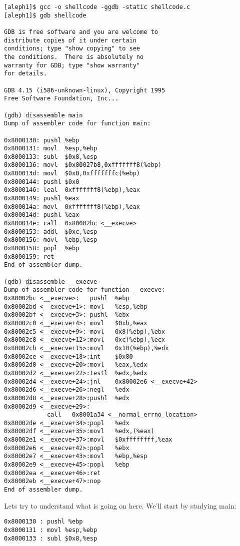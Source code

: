 \documentclass[10pt]{article}
\begin{document}
\begin{CJK}{UTF8}{bsmi}
{\small
\begin{verbatim}
[aleph1]$ gcc -o shellcode -ggdb -static shellcode.c
[aleph1]$ gdb shellcode

GDB is free software and you are welcome to 
distribute copies of it under certain 
conditions; type "show copying" to see 
the conditions.  There is absolutely no 
warranty for GDB; type "show warranty" 
for details.

GDB 4.15 (i586-unknown-linux), Copyright 1995 
Free Software Foundation, Inc...

(gdb) disassemble main
Dump of assembler code for function main:

0x8000130: pushl %ebp
0x8000131: movl  %esp,%ebp
0x8000133: subl  $0x8,%esp
0x8000136: movl  $0x80027b8,0xfffffff8(%ebp)
0x800013d: movl  $0x0,0xfffffffc(%ebp)
0x8000144: pushl $0x0
0x8000146: leal  0xfffffff8(%ebp),%eax
0x8000149: pushl %eax
0x800014a: movl  0xfffffff8(%ebp),%eax
0x800014d: pushl %eax
0x800014e: call  0x80002bc <__execve>
0x8000153: addl  $0xc,%esp
0x8000156: movl  %ebp,%esp
0x8000158: popl  %ebp
0x8000159: ret
End of assembler dump.

(gdb) disassemble __execve
Dump of assembler code for function __execve:
0x80002bc <__execve>:   pushl  %ebp
0x80002bd <__execve+1>: movl   %esp,%ebp
0x80002bf <__execve+3>: pushl  %ebx
0x80002c0 <__execve+4>: movl   $0xb,%eax
0x80002c5 <__execve+9>: movl   0x8(%ebp),%ebx
0x80002c8 <__execve+12>:movl   0xc(%ebp),%ecx
0x80002cb <__execve+15>:movl   0x10(%ebp),%edx
0x80002ce <__execve+18>:int    $0x80
0x80002d0 <__execve+20>:movl   %eax,%edx
0x80002d2 <__execve+22>:testl  %edx,%edx
0x80002d4 <__execve+24>:jnl    0x80002e6 <__execve+42>
0x80002d6 <__execve+26>:negl   %edx
0x80002d8 <__execve+28>:pushl  %edx
0x80002d9 <__execve+29>:
            call   0x8001a34 <__normal_errno_location>
0x80002de <__execve+34>:popl   %edx
0x80002df <__execve+35>:movl   %edx,(%eax)
0x80002e1 <__execve+37>:movl   $0xffffffff,%eax
0x80002e6 <__execve+42>:popl   %ebx
0x80002e7 <__execve+43>:movl   %ebp,%esp
0x80002e9 <__execve+45>:popl   %ebp
0x80002ea <__execve+46>:ret
0x80002eb <__execve+47>:nop
End of assembler dump.
\end{verbatim}
}

Lets try to understand what is going on here.  We'll start by studying main: 

\begin{verbatim}
0x8000130 : pushl %ebp
0x8000131 : movl %esp,%ebp
0x8000133 : subl $0x8,%esp
\end{verbatim}


\end{CJK}
\end{document}
